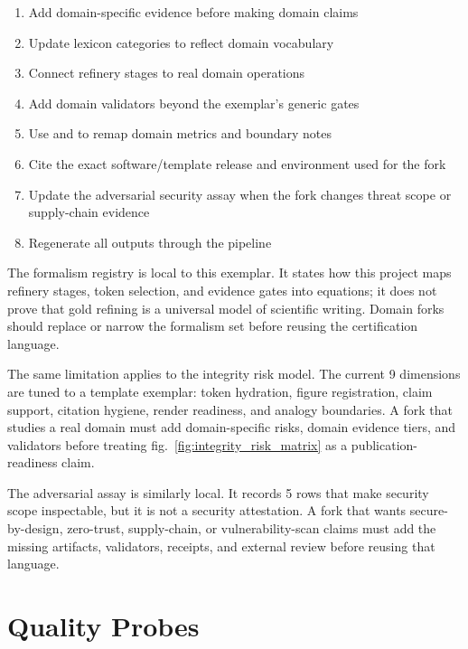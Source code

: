 \documentclass[
]{article}
\providecommand{\tightlist}{%
  \setlength{\itemsep}{0pt}\setlength{\parskip}{0pt}}
\begin{document}
\begin{enumerate}
\def\labelenumi{\arabic{enumi}.}
\tightlist
\item
  Add domain-specific evidence before making domain claims
\item
  Update lexicon categories to reflect domain vocabulary
\item
  Connect refinery stages to real domain operations
\item
  Add domain validators beyond the exemplar's generic gates
\item
  Use  and
   to remap domain metrics and
  boundary notes
\item
  Cite the exact software/template release and environment used for the
  fork
\item
  Update the adversarial security assay when the fork changes threat
  scope or supply-chain evidence
\item
  Regenerate all outputs through the pipeline
\end{enumerate}

The formalism registry is local to this exemplar. It states how this
project maps refinery stages, token selection, and evidence gates into
equations; it does not prove that gold refining is a universal model of
scientific writing. Domain forks should replace or narrow the formalism
set before reusing the certification language.

The same limitation applies to the integrity risk model. The current 9
dimensions are tuned to a template exemplar: token hydration, figure
registration, claim support, citation hygiene, render readiness, and
analogy boundaries. A fork that studies a real domain must add
domain-specific risks, domain evidence tiers, and validators before
treating fig.~\ref{fig:integrity_risk_matrix} as a publication-readiness
claim.

The adversarial assay is similarly local. It records 5 rows that make
security scope inspectable, but it is not a security attestation. A fork
that wants secure-by-design, zero-trust, supply-chain, or
vulnerability-scan claims must add the missing artifacts, validators,
receipts, and external review before reusing that language.

\newpage

\section{Quality Probes}\label{sec:evaluation}
\end{document}
